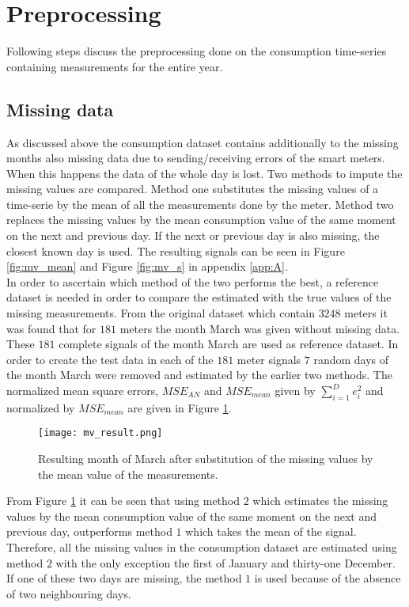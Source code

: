 \section{Preprocessing}

Following steps discuss the preprocessing done on the consumption time-series containing measurements for the entire year. 

\subsection{Missing data} \label{s:missing_data}
As discussed above the consumption dataset contains additionally to the missing months also missing data due to sending/receiving errors of the smart meters. When this happens the data of the whole day is lost. Two methods to impute the missing values are compared. Method one substitutes the missing values of a time-serie by the mean of all the measurements done by the meter. Method two replaces the missing values by the mean consumption value of the same moment on the next and previous day. If the next or previous day is also missing, the closest known day is used. The resulting signals can be seen in Figure \ref{fig:mv_mean} and Figure \ref{fig:mv_s} in appendix \ref{app:A}.\\

In order to ascertain which method of the two performs the best, a reference dataset is needed in order to compare the estimated with the true values of the missing measurements. From the original dataset which contain $ 3248 $ meters it was found that for $ 181 $ meters the month March was given without missing data. These $ 181 $ complete signals of the month March are used as reference dataset. In order to create the test data in each of the $ 181  $ meter signals $ 7 $ random days of the month March were removed and estimated by the earlier two methods. The normalized mean square errors, $ MSE_{AN} $ and $ MSE_{mean} $ given by $ \sum_{i=1}^{D} e_i^2  $ and normalized by $ MSE_{mean} $ are given in Figure \ref{fig:mv_result}.

\begin{figure}[h!]
	\centering
	\texttt{[image: mv\_result.png]}
	\caption{Resulting month of March after substitution of the missing values by the mean value of the measurements. }
	\label{fig:mv_result}
\end{figure}

From Figure \ref{fig:mv_result} it can be seen that using method $ 2 $ which estimates the missing values by the mean consumption value of the same moment on the next and previous day, outperforms method $ 1 $ which takes the mean of the signal. Therefore, all the missing values in the consumption dataset are estimated using method $ 2 $ with the only exception the first of January and thirty-one December. If one of these two days are missing, the method $ 1 $ is used because of the absence of two neighbouring days. 

